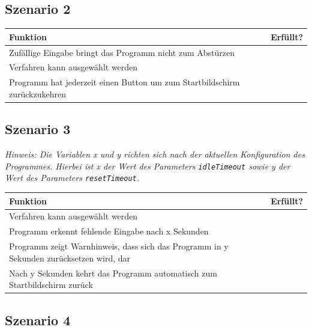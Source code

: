 \documentclass{article}
\newcommand{\cmark}{\ding{51}}
\begin{document}
  \subsection{Szenario 2}
    \begin{table}[H]
      \begin{tabularx}{\textwidth}{| >{\raggedright\arraybackslash}X | c |}
        \hline
        \textbf{Funktion} & \textbf{Erfüllt?} \\
        \hline
        Zufällige Eingabe bringt das Programm nicht zum Abstürzen & \cmark \\
        \hline
        Verfahren kann ausgewählt werden & \cmark \\
        \hline
        Programm hat jederzeit einen Button um zum Startbildschirm zurückzukehren & \cmark \\
        \hline
      \end{tabularx}
    \end{table}

  \subsection{Szenario 3}
    \textit{Hinweis: Die Variablen x und y richten sich nach der aktuellen Konfiguration des Programmes. Hierbei
      ist x der Wert des Parameters \texttt{idleTimeout} sowie y der Wert des Parameters \texttt{resetTimeout}.}
    \newline

    \begin{table}[H]
      \begin{tabularx}{\textwidth}{| >{\raggedright\arraybackslash}X | c |}
        \hline
        \textbf{Funktion} & \textbf{Erfüllt?} \\
        \hline
        Verfahren kann ausgewählt werden & \cmark \\
        \hline
        Programm erkennt fehlende Eingabe nach x Sekunden & \cmark \\
        \hline
        Programm zeigt Warnhinweis, dass sich das Programm in y Sekunden zurücksetzen wird, dar & \cmark \\
        \hline
        Nach y Sekunden kehrt das Programm automatisch zum Startbildschirm zurück & \cmark \\
        \hline
      \end{tabularx}
    \end{table}

  \subsection{Szenario 4}
\end{document}
